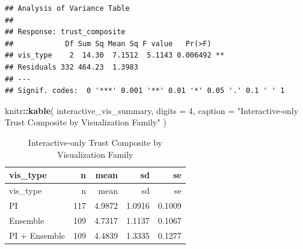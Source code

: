 \documentclass[
]{article}
\newenvironment{Shaded}{\begin{snugshade}}{\end{snugshade}}
\newcommand{\AttributeTok}[1]{\textcolor[rgb]{0.13,0.29,0.53}{#1}}
\newcommand{\DecValTok}[1]{\textcolor[rgb]{0.00,0.00,0.81}{#1}}
\newcommand{\FunctionTok}[1]{\textcolor[rgb]{0.13,0.29,0.53}{\textbf{#1}}}
\newcommand{\NormalTok}[1]{#1}
\newcommand{\SpecialCharTok}[1]{\textcolor[rgb]{0.81,0.36,0.00}{\textbf{#1}}}
\newcommand{\StringTok}[1]{\textcolor[rgb]{0.31,0.60,0.02}{#1}}
\begin{document}
\begin{verbatim}
## Analysis of Variance Table
## 
## Response: trust_composite
##            Df Sum Sq Mean Sq F value   Pr(>F)   
## vis_type    2  14.30  7.1512  5.1143 0.006492 **
## Residuals 332 464.23  1.3983                    
## ---
## Signif. codes:  0 '***' 0.001 '**' 0.01 '*' 0.05 '.' 0.1 ' ' 1
\end{verbatim}

\begin{Shaded}
\begin{Highlighting}[]
\NormalTok{knitr}\SpecialCharTok{::}\FunctionTok{kable}\NormalTok{(}
\NormalTok{  interactive\_vis\_summary,}
  \AttributeTok{digits =} \DecValTok{4}\NormalTok{,}
  \AttributeTok{caption =} \StringTok{"Interactive{-}only Trust Composite by Visualization Family"}
\NormalTok{)}
\end{Highlighting}
\end{Shaded}

\begin{longtable}[]{@{}lrrrr@{}}
\caption{Interactive-only Trust Composite by Visualization
Family}\tabularnewline
\toprule\noalign{}
vis\_type & n & mean & sd & se \\
\midrule\noalign{}
\endfirsthead
\toprule\noalign{}
vis\_type & n & mean & sd & se \\
\midrule\noalign{}
\endhead
\bottomrule\noalign{}
\endlastfoot
PI & 117 & 4.9872 & 1.0916 & 0.1009 \\
Ensemble & 109 & 4.7317 & 1.1137 & 0.1067 \\
PI + Ensemble & 109 & 4.4839 & 1.3335 & 0.1277 \\
\end{longtable}
\end{document}
